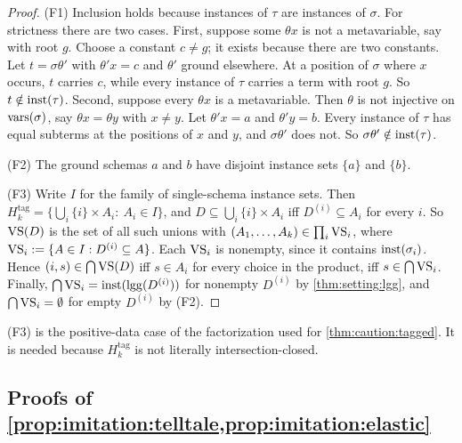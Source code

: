 \begin{proof}
(F1) Inclusion holds because instances of $\tau$ are instances of $\sigma$. For strictness there are two cases. First, suppose some $\theta x$ is not a metavariable, say with root $g$. Choose a constant $c\neq g$; it exists because there are two constants. Let $t=\sigma\theta'$ with $\theta'x=c$ and $\theta'$ ground elsewhere. At a position of $\sigma$ where $x$ occurs, $t$ carries $c$, while every instance of $\tau$ carries a term with root $g$. So $t\notin\mathrm{inst}(\tau)$. Second, suppose every $\theta x$ is a metavariable. Then $\theta$ is not injective on $\mathrm{vars}(\sigma)$, say $\theta x=\theta y$ with $x\neq y$. Let $\theta'x=a$ and $\theta'y=b$. Every instance of $\tau$ has equal subterms at the positions of $x$ and $y$, and $\sigma\theta'$ does not. So $\sigma\theta'\notin\mathrm{inst}(\tau)$.

(F2) The ground schemas $a$ and $b$ have disjoint instance sets $\{a\}$ and $\{b\}$.

(F3) Write $I$ for the family of single-schema instance sets. Then $H^{\mathrm{tag}}_k=\{\bigcup_i\{i\}\times A_i:\ A_i\in I\}$, and $D\subseteq\bigcup_i\{i\}\times A_i$ iff $D^{(i)}\subseteq A_i$ for every $i$. So $\mathrm{VS}(D)$ is the set of all such unions with $(A_1,\dots,A_k)\in\prod_i\mathrm{VS}_i$, where $\mathrm{VS}_i:=\{A\in I:D^{(i)}\subseteq A\}$. Each $\mathrm{VS}_i$ is nonempty, since it contains $\mathrm{inst}(\sigma_i)$. Hence $(i,s)\in\bigcap\mathrm{VS}(D)$ iff $s\in A_i$ for every choice in the product, iff $s\in\bigcap\mathrm{VS}_i$. Finally, $\bigcap\mathrm{VS}_i=\mathrm{inst}(\mathrm{lgg}(D^{(i)}))$ for nonempty $D^{(i)}$ by \cref{thm:setting:lgg}, and $\bigcap\mathrm{VS}_i=\emptyset$ for empty $D^{(i)}$ by (F2).
\end{proof}

(F3) is the positive-data case of the factorization used for \cref{thm:caution:tagged}. It is needed because $H^{\mathrm{tag}}_k$ is not literally intersection-closed.

\subsection{Proofs of \texorpdfstring{\cref{prop:imitation:telltale,prop:imitation:elastic}}{the anchor propositions}}\label{app:imitation:anchors}

